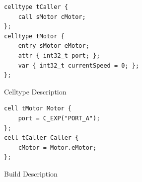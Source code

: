 \documentclass[conference]{IEEEtran/IEEEtran/IEEEtran}
\begin{document}
\begin{figure}[H]
\centering
\begin{lstlisting}
celltype tCaller {
    call sMotor cMotor;
};
celltype tMotor {
    entry sMotor eMotor;
    attr { int32_t port; };
    var { int32_t currentSpeed = 0; };
};
\end{lstlisting}
    \vspace{-2mm}
\caption{Celltype Description}
    \vspace{-5mm}
\label{celltype}
\end{figure}

\begin{figure}[H]
\centering
\begin{lstlisting}
cell tMotor Motor {
    port = C_EXP("PORT_A");
};
cell tCaller Caller {
    cMotor = Motor.eMotor;
};
\end{lstlisting}
    \vspace{-2mm}
\caption{Build Description}
    \vspace{-2mm}
\label{build}
\end{figure}
%
%
\end{document}
